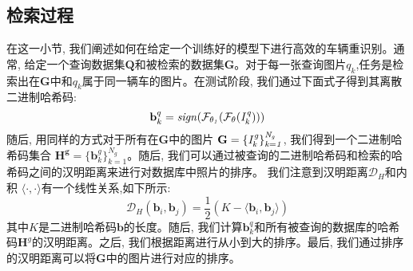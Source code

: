 \subsection{检索过程}

在这一小节, 我们阐述如何在给定一个训练好的模型下进行高效的车辆重识别。通常, 给定一个查询数据集$\mathbf{Q}$和被检索的数据集$\mathbf{G}$。对于每一张查询图片$q_k$,任务是检索出在$\mathbf{G}$中和$q_k$属于同一辆车的图片。在测试阶段, 我们通过下面式子得到其离散二进制哈希码:
\begin{equation}
    \mathbf{b}_k^q = \mathbf{\it{sign}(\mathcal{F}_{\theta_1}(\mathcal{F}_{\theta}(\it{I}^q_k)))}
\end{equation}
随后, 用同样的方式对于所有在$\mathbf{G}$中的图片 $\mathbf{G} = \{\it{I}^g_k\}_{k=1}^{N_g} $, 我们得到一个二进制哈希码集合  $\mathbf{H^g} = \{\mathbf{b}_k^g\}_{k=1}^{N_g}$。随后, 我们可以通过被查询的二进制哈希码和检索的哈希码之间的汉明距离来进行对数据库中照片的排序。 我们注意到汉明距离$\mathcal{D}_H$和内积 $\langle\cdot, \cdot \rangle$有一个线性关系,如下所示:
\begin{equation}
    \mathcal{D}_H(\mathbf{b}_i,\mathbf{b}_j) = \frac{1}{2}(K - \langle \mathbf{b}_i, \mathbf{b}_j \rangle)
\end{equation}
其中$K$是二进制哈希码$\mathbf{b}$的长度。随后, 我们计算$\mathbf{b}_k^q$和所有被查询的数据库的哈希码$\mathbf{H}^g$的汉明距离。之后, 我们根据距离进行从小到大的排序。最后, 我们通过排序的汉明距离可以将$\mathbf{G}$中的图片进行对应的排序。

